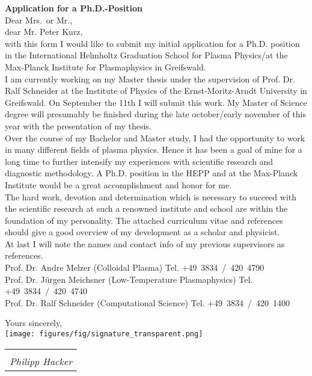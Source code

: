 \documentclass[11pt,a4paper]{moderncv}
\makeatletter
\newcommand{\sign}[1]{%
  \begin{tabular}[t]{@{}l@{}}
  \makebox[1.5in]{\dotfill}\\
  \strut\emph{#1}\strut%
  \end{tabular}%
}
\makeatother
\begin{document}
	\vspace*{1.0cm}
	{\bfseries \color{familynamecolor}%
		Application for a Ph.D.-Position
	}\\[0.75cm]
%	
	Dear Mrs.\ or Mr.,\\
	dear Mr. Peter Kurz,\\[0.5cm]
%	
	with this form I would like to submit my initial application for a Ph.D. position in the International Helmholtz Graduation School for Plasma Physics/at the Max-Planck Institute for Plasmaphysics in Greifswald.\\[0.2cm]
%
		I am currently working on my Master thesis under the supervision of Prof. Dr. Ralf Schneider at the Institute of Physics of the Ernst-Moritz-Arndt University in Greifswald. On September the 11th I will submit this work. My Master of Science degree will presumably be finished during the late october/early november of this year with the presentation of my thesis.\\[0.2cm] 
%
		Over the course of my Bachelor and Master study, I had the opportunity to work in many different fields of plasma physics. Hence it has been a goal of mine for a long time to further intensify my experiences with scientific research and diagnostic methodology. A Ph.D. position in the HEPP and at the Max-Planck Institute would be a great accomplishment and honor for me.\\[0.2cm]
%
		The hard work, devotion and determination which is necessary to succeed with the scientific research at such a renowned institute and school are within the foundation of my personality. The attached curriculum vitae and references should give a good overview of my development as a scholar and physicist.\\[0.3cm]
%
		At last I will note the names and contact info of my previous supervisors as references.\\[0.2cm]
		\hspace*{0.5cm}Prof. Dr. Andre Melzer (Colloidal Plasma)%
			\hfill Tel. +49~3834~/~420~4790\\
		\hspace*{0.5cm}Prof. Dr. Jürgen Meichsner (Low-Temperature Plasmaphysics)%
			\hfill Tel. +49~3834~/~420~4740\\
		\hspace*{0.5cm}Prof. Dr. Ralf Schneider (Computational Science)%
			\hfill Tel. +49~3834~/~420~1400\\
%
	\vspace*{0.2cm}
	\begin{flushleft}
		Yours sincerely,\\[0.75cm]
		\vspace*{-1.0cm}%
		\texttt{[image: figures/fig/signature\_transparent.png]}
		\hspace*{-4.0cm}\sign{Philipp Hacker}\\[0.0cm]
	\end{flushleft}
%
	\newpage
	\pagestyle{fancy}
\end{document}
